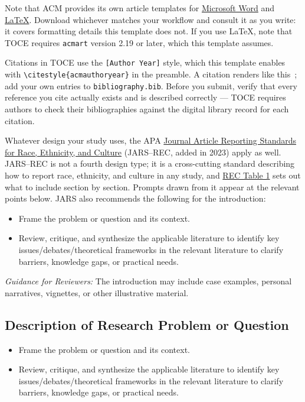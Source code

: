 \documentclass[acmsmall,screen,anonymous,review]{acmart}
\begin{document}
Note that ACM provides its own article templates for \href{https://www.acm.org/binaries/content/assets/publications/taps/acm_submission_template.docx}{Microsoft Word} and \href{https://portalparts.acm.org/hippo/latex_templates/acmart-primary.zip}{LaTeX}. Download whichever matches your workflow and consult it as you write: it covers formatting details this template does not. If you use LaTeX, note that TOCE requires \texttt{acmart} version 2.19 or later, which this template assumes.

Citations in TOCE use the \verb|[Author Year]| style, which this template enables with \verb|\citestyle{acmauthoryear}| in the preamble. A citation renders like this~\cite{Bak2017}; add your own entries to \texttt{bibliography.bib}. Before you submit, verify that every reference you cite actually exists and is described correctly --- TOCE requires authors to check their bibliographies against the digital library record for each citation.

Whatever design your study uses, the APA \href{https://apastyle.apa.org/jars/race-ethnicity-culture}{Journal Article Reporting Standards for Race, Ethnicity, and Culture} (JARS--REC, added in 2023) apply as well. JARS--REC is not a fourth design type; it is a cross-cutting standard describing how to report race, ethnicity, and culture in any study, and \href{https://apastyle.apa.org/jars/rec-table-1.pdf}{REC Table 1} sets out what to include section by section. Prompts drawn from it appear at the relevant points below.
JARS also recommends the following for the introduction:
\begin{itemize}
    \item Frame the problem or question and its context.
    \item Review, critique, and synthesize the applicable literature to identify key issues/debates/theoretical frameworks in the relevant literature to clarify barriers, knowledge gaps, or practical needs.
\end{itemize}

\textit{Guidance for Reviewers:} The introduction may include case examples, personal narratives, vignettes, or other
illustrative material.

\subsection{Description of Research Problem or Question}

\begin{itemize}
    \item Frame the problem or question and its context.
    \item Review, critique, and synthesize the applicable literature to identify key issues/debates/theoretical frameworks in the relevant literature to clarify barriers, knowledge gaps, or practical needs.
\end{itemize}
\end{document}
